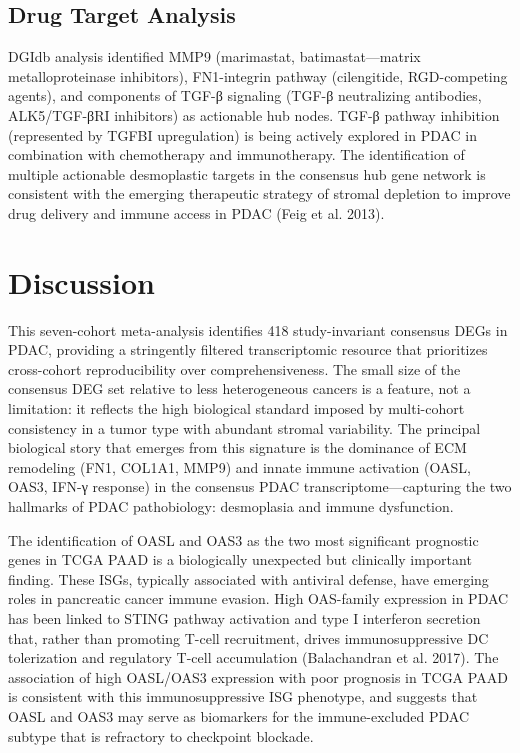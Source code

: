 \documentclass[
  12pt,
]{article}
\begin{document}
\subsection{Drug Target Analysis}\label{drug-target-analysis}

DGIdb analysis identified MMP9 (marimastat, batimastat---matrix
metalloproteinase inhibitors), FN1-integrin pathway (cilengitide,
RGD-competing agents), and components of TGF-β signaling (TGF-β
neutralizing antibodies, ALK5/TGF-βRI inhibitors) as actionable hub
nodes. TGF-β pathway inhibition (represented by TGFBI upregulation) is
being actively explored in PDAC in combination with chemotherapy and
immunotherapy. The identification of multiple actionable desmoplastic
targets in the consensus hub gene network is consistent with the
emerging therapeutic strategy of stromal depletion to improve drug
delivery and immune access in PDAC (Feig et al. 2013).

\section{Discussion}\label{discussion}

This seven-cohort meta-analysis identifies 418 study-invariant consensus
DEGs in PDAC, providing a stringently filtered transcriptomic resource
that prioritizes cross-cohort reproducibility over comprehensiveness.
The small size of the consensus DEG set relative to less heterogeneous
cancers is a feature, not a limitation: it reflects the high biological
standard imposed by multi-cohort consistency in a tumor type with
abundant stromal variability. The principal biological story that
emerges from this signature is the dominance of ECM remodeling (FN1,
COL1A1, MMP9) and innate immune activation (OASL, OAS3, IFN-γ response)
in the consensus PDAC transcriptome---capturing the two hallmarks of
PDAC pathobiology: desmoplasia and immune dysfunction.

The identification of OASL and OAS3 as the two most significant
prognostic genes in TCGA PAAD is a biologically unexpected but
clinically important finding. These ISGs, typically associated with
antiviral defense, have emerging roles in pancreatic cancer immune
evasion. High OAS-family expression in PDAC has been linked to STING
pathway activation and type I interferon secretion that, rather than
promoting T-cell recruitment, drives immunosuppressive DC tolerization
and regulatory T-cell accumulation (Balachandran et al. 2017). The
association of high OASL/OAS3 expression with poor prognosis in TCGA
PAAD is consistent with this immunosuppressive ISG phenotype, and
suggests that OASL and OAS3 may serve as biomarkers for the
immune-excluded PDAC subtype that is refractory to checkpoint blockade.
\end{document}
